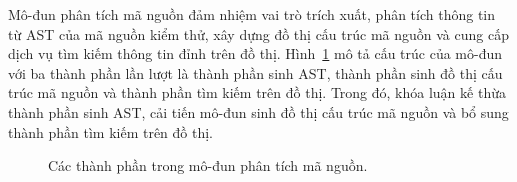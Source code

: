 %     

Mô-đun phân tích mã nguồn đảm nhiệm vai trò trích xuất, phân tích thông tin từ AST của mã nguồn kiểm thử, xây dựng đồ thị cấu trúc mã nguồn và cung cấp dịch vụ tìm kiếm thông tin đỉnh trên đồ thị. Hình~\ref{fig:module-analyze} mô tả cấu trúc của mô-đun với ba thành phần lần lượt là thành phần sinh AST, thành phần sinh đồ thị cấu trúc mã nguồn và thành phần tìm kiếm trên đồ thị. Trong đó, khóa luận kế thừa thành phần sinh AST, cải tiến mô-đun sinh đồ thị cấu trúc mã nguồn và bổ sung thành phần tìm kiếm trên đồ thị.
\vspace{5mm}
\begin{figure}[h]
    \centering
    
    \caption{Các thành phần trong mô-đun phân tích mã nguồn.}
    \label{fig:module-analyze}
\end{figure}

